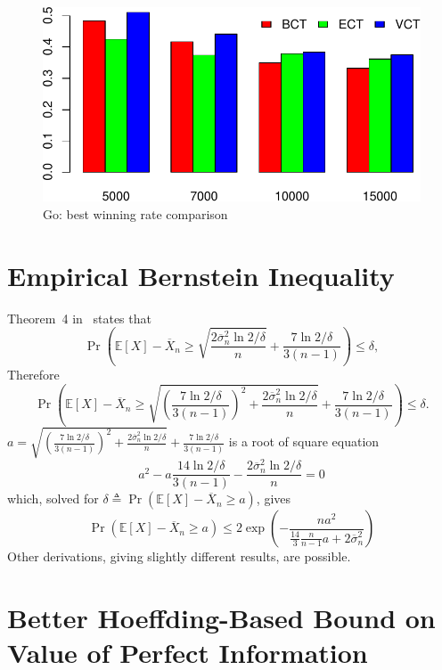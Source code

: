 \documentclass{article}
\newcommand {\IE} {\ensuremath {\mathbb{E}}}
\begin{document}
\begin{figure}[h]
\centering
\includegraphics[scale=0.8]{bests-colorful.pdf}
\caption{Go: best winning rate comparison}
\label{fig:best-winning-rate}
\end{figure}

\clearpage

\appendix

\section{Empirical Bernstein Inequality}
\label{app:deriv-conc-empbernstein}

Theorem~4 in~\cite{MaurerPontil.benrstein} states that
\[\Pr\left(\IE[X]-\overline X_n \ge \sqrt { \frac {2\overline\sigma_n^2 \ln 2/\delta} n } + \frac {7 \ln 2/\delta} {3(n-1)}\right)\le \delta,\]
Therefore
\[\Pr\left(\IE[X]-\overline X_n \ge \sqrt { \left(\frac {7 \ln 2/\delta} {3(n-1)}\right)^2+\frac {2\overline\sigma_n^2 \ln 2/\delta} n } + \frac {7 \ln 2/\delta} {3(n-1)}\right)\le
\delta.\]
$a=\sqrt { \left(\frac {7 \ln 2/\delta} {3(n-1)}\right)^2+\frac {2\overline\sigma_n^2 \ln 2/\delta} n } + \frac {7 \ln 2/\delta} {3(n-1)}$ is a root of
square equation
\[a^2-a\frac {14 \ln 2/\delta} {3(n-1)} -\frac {2\overline\sigma_n^2 \ln 2/\delta} n=0\]
which, solved for $\delta\triangleq\Pr(\IE[X]-\overline X_n\ge a)$,
gives
\[\Pr(\IE[X]-\overline X_n\ge a)\le 2\exp \left( - \frac {na^2} {\frac {14} {3} \frac {n} {n-1}a+2\overline\sigma_n^2}\right)\]
Other derivations, giving slightly different results, are possible.

\section{Better Hoeffding-Based Bound on Value of Perfect Information}
\label{app:better-hoeffding-bound}
\end{document}
